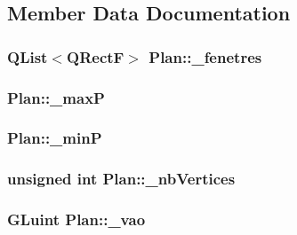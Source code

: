 \subsection{Member Data Documentation}
\hypertarget{class_plan_aa9fdbf8efac3f80ffd8bb2f789e7f4f2}{
\subsubsection[{\+\_\+fenetres}]{\setlength{\rightskip}{0pt plus 5cm}Q\+List$<$Q\+Rect\+F$>$ Plan\+::\+\_\+fenetres\hspace{0.3cm}{\ttfamily [private]}}}\label{class_plan_aa9fdbf8efac3f80ffd8bb2f789e7f4f2}
\hypertarget{class_plan_a2dce54e58d00f40ed8da5c9bd34c1232}{
\subsubsection[{\+\_\+max\+P}]{ Plan\+::\+\_\+max\+P\hspace{0.3cm}{\ttfamily [private]}}}\label{class_plan_a2dce54e58d00f40ed8da5c9bd34c1232}
\hypertarget{class_plan_aad9837a269e87fa5d7a4a5fc90abf3e7}{
\subsubsection[{\+\_\+min\+P}]{ Plan\+::\+\_\+min\+P\hspace{0.3cm}{\ttfamily [private]}}}\label{class_plan_aad9837a269e87fa5d7a4a5fc90abf3e7}
\hypertarget{class_plan_af3d9228c1b7dc91c0cb00d4c8fa5a550}{
\subsubsection[{\+\_\+nb\+Vertices}]{\setlength{\rightskip}{0pt plus 5cm}unsigned int Plan\+::\+\_\+nb\+Vertices\hspace{0.3cm}{\ttfamily [private]}}}\label{class_plan_af3d9228c1b7dc91c0cb00d4c8fa5a550}
\hypertarget{class_plan_ab4efe8532b73dd0efca80000afb0027d}{
\subsubsection[{\+\_\+vao}]{\setlength{\rightskip}{0pt plus 5cm}G\+Luint Plan\+::\+\_\+vao\hspace{0.3cm}{\ttfamily [private]}}}\label{class_plan_ab4efe8532b73dd0efca80000afb0027d}
